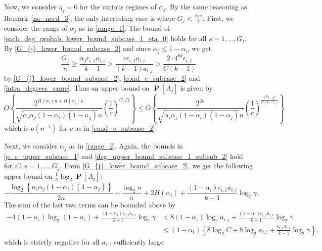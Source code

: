 \documentclass[11pt,reqno]{amsart}
\theoremstyle{definition}
\theoremstyle{remark}
\theoremstyle{conjecture}
\DeclareMathOperator{\Prob}{\mathbf{P}}
\begin{document}
Now, we consider $\eta_{j} = 0$ for the various regimes of $\alpha_{j}$. By the same reasoning as Remark~\ref{no_need_3}, the only interesting case is where $G_{j} < \frac{\alpha_{i} n}{2}$. First, we consider the range of $\alpha_{j}$ as in \eqref{range_1}. The bound of \eqref{each_deg_probab_lower_bound_subcase_1_eta_0} holds for all $s = 1, \ldots, G_{j}$. By \eqref{G_{j}_lower_bound_subcase_2} and since $\alpha_{j} \leqslant 1-\alpha_{i}$, we get 
\begin{equation}
\frac{G_{j}}{n} \geqslant \frac{\alpha_{j} \epsilon_{i,1} a_{i,i}}{k-1} > \frac{c \epsilon_{i,1} a_{i,i}}{(k-1) a_{i,j}} > \frac{2 \cdot 4^{8k} \epsilon_{i,1}}{C(k-1)}
\end{equation}
by \eqref{G_{j}_lower_bound_subcase_2}, \eqref{cond_c_subcase_2} and \eqref{intra_degrees_same}. Thus an upper bound on $\Prob[A_{j}]$ is given by 
\begin{equation}
O\left\{\frac{2^{H(\alpha_{i})n + H(\alpha_{j})n}}{\sqrt{\alpha_{i} \alpha_{j} (1-\alpha_{i}) (1-\alpha_{j})} n} \left(\frac{1}{c}\right)^{G_{j}/2}\right\} \leqslant O\left\{\frac{2^{2n}}{\sqrt{\alpha_{i} \alpha_{j} (1-\alpha_{i}) (1-\alpha_{j})} n} \left(\frac{1}{c}\right)^{\frac{4^{8k} \epsilon_{i,1} n}{C(k-1)}}\right\} \nonumber
\end{equation}
which is $o(n^{-1})$ for $c$ as in \eqref{cond_c_subcase_2}. 

Next, we consider $\alpha_{j}$ as in \eqref{range_2}. Again, the bounds in \eqref{p_s_upper_subcase_1} and \eqref{deg_upper_bound_subcase_1_subsub_2} hold for all $s = 1, \ldots, G_{j}$. From \eqref{G_{j}_lower_bound_subcase_2}, we get the following upper bound on $\frac{1}{n} \log_{2} \Prob[A_{j}]$:
\begin{equation}
-\frac{\log_{2}\left\{\alpha_{i} \alpha_{j} (1-\alpha_{i}) (1-\alpha_{j})\right\}}{2n} - \frac{\log_{2} n}{n} + 2H(\alpha_{i}) + \frac{(1-\alpha_{i}) \epsilon_{i,1} a_{i,i}}{k-1} \log_{2} \gamma. \nonumber
\end{equation}
The sum of the last two terms can be bounded above by
\begin{align}
-4(1-\alpha_{i}) \log_{2} (1-\alpha_{i}) + \frac{(1-\alpha_{i}) \epsilon_{i,1} a_{i,i}}{k-1} \log_{2} \gamma &< 8 (1-\alpha_{i})  \log_{2} a_{i,j} + \frac{(1-\alpha_{i}) \epsilon_{i,1} a_{i,i}}{k-1} \log_{2} \gamma \nonumber\\
&\leqslant (1-\alpha_{i}) \left\{8\log_{2} C + 8\log_{2} a_{i,i} + \frac{\epsilon_{i,1} a_{i,i}}{k-1} \log_{2} \gamma\right\}, \nonumber
\end{align}
which is strictly negative for all $a_{i,i}$ sufficiently large. 
\end{document}
